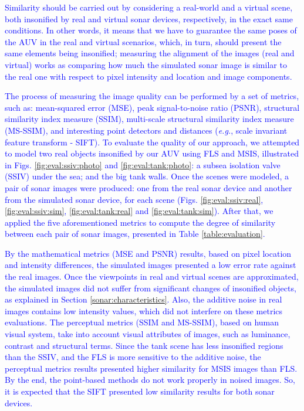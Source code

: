 \documentclass[final,5p,times]{elsarticle}
\begin{document}
\textcolor{blue}{Similarity should be carried out by considering a real-world and a virtual scene, both insonified by real and virtual sonar devices, respectively, in the exact same conditions. In other words, it means that we have to guarantee the same poses of the AUV in the real and virtual scenarios, which, in turn, should present the same elements being insonified; measuring the alignment of the images (real and virtual) works as comparing how much the simulated sonar image is similar to the real one with respect to pixel intensity and location and image components.}

\textcolor{blue}{The process of measuring the image quality can be performed by a set of metrics, such as: mean-squared error (MSE), peak signal-to-noise ratio (PSNR), structural similarity index measure (SSIM), multi-scale structural similarity index measure (MS-SSIM), and interesting point detectors and distances (\textit{e.g.}, scale invariant feature transform - SIFT). To evaluate the quality of our approach, we attempted to model two real objects insonified by our AUV using FLS and MSIS, illustrated in Figs. \ref{fig:eval:ssiv:photo} and \ref{fig:eval:tank:photo}: a subsea isolation valve (SSIV) under the sea; and the big tank walls. Once the scenes were modeled, a pair of sonar images were produced: one from the real sonar device and another from the simulated sonar device, for each scene (Figs. \ref{fig:eval:ssiv:real}, \ref{fig:eval:ssiv:sim}, \ref{fig:eval:tank:real} and \ref{fig:eval:tank:sim}). After that, we applied the five aforementioned metrics to compute the degree of similarity between each pair of sonar images, presented in Table \ref{table:evaluation}.}

\textcolor{blue}{By the mathematical metrics (MSE and PSNR) results, based on pixel location and intensity differences, the simulated images presented a low error rate against the real images. Once the viewpoints in real and virtual scenes are approximated, the simulated images did not suffer from significant changes of insonified objects, as explained in Section \ref{sonar:characteristics}. Also, the additive noise in real images contains low intensity values, which did not interfere on these metrics evaluations.
The perceptual metrics (SSIM and MS-SSIM), based on human visual system, take into account visual attributes of images, such as luminance, contrast and structural terms. Since the tank scene has less insonified regions than the SSIV, and the FLS is more sensitive to the additive noise, the perceptual metrics results presented higher similarity for MSIS images than FLS.
By the end, the point-based methods do not work properly in noised images. So, it is expected that the SIFT presented low similarity results for both sonar devices.}
\end{document}
